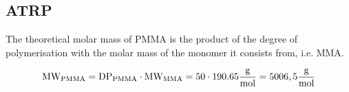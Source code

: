 \subsection{ATRP}

    The theoretical molar mass of PMMA is the product of the degree of polymerisation
    with the molar mass of the monomer it consists from, i.e. MMA.
    
    $$\mathtext[PMMA]{MW} = \mathtext[PMMA]{DP} \cdot \mathtext[MMA]{MW} = 50 \cdot 190.65\MW =5006,5\MW$$

    